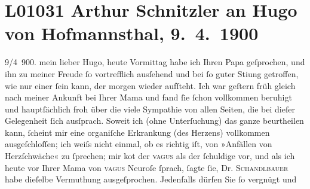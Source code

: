 

\section[Arthur Schnitzler an Hugo von Hofmannsthal, 9. 4. 1900]{L01031 Arthur Schnitzler an Hugo von Hofmannsthal, 9. 4. 1900}
\nopagebreak{}
\rehead{ }\normalsize\beginnumbering{}
\toendnotes[C]{\smallbreak\pagebreak[2]}
\toendnotes[C]{\smallbreak}
\pstart
           \raggedleft{}{\pb}9/4 900. \pend
           \vspace{0.5em}
\pstart
           mein lieber Hugo, heute Vormittag habe ich Ihren Papa geſprochen, und ihn zu meiner Freude
               ſo vortrefflich ausſehend und bei ſo guter Sti{\geminationm}ung
               getroffen, wie nur einer ſein kann, der morgen wieder aufſteht. Ich war geſtern
                  früh gleich nach meiner Ankunft bei Ihrer Mama und fand ſie ſchon vollkommen beruhigt
               und hauptſächlich froh über die viele Sympathie von allen Seiten, die bei dieſer
               Gelegenheit ſich ausſprach. {\pb}Soweit ich (ohne
               Unterſuchung) das ganze beurtheilen kann, ſcheint mir eine organiſche Erkrankung \introOben{}(des Herzens)\introOben{} vollkommen ausgeſchloſſen; ich weiſs nicht
               einmal, ob es richtig iſt, von »Anfällen von Herzſchwäche« zu ſprechen; mir ko{\geminationm}t der \textsc{vagus} als der ſchuldige
               vor, und als ich heute vor Ihrer Mama von \textsc{vagus} Neuroſe ſprach, ſagte ſie, Dr. \textsc{Schandlbauer} habe dieſelbe Vermuthung ausgeſprochen. Jedenfalls dürfen Sie ſo vergnügt und
